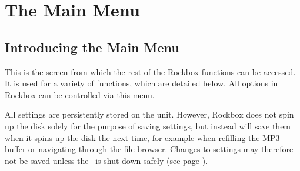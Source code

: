 \chapter{The Main Menu}

\section{Introducing the Main Menu}
This is the screen from which the rest of the Rockbox functions can be 
accessed. It is used for a variety of functions, which are detailed below. 
All options in Rockbox can be controlled via this menu.

All settings are persistently stored on the unit. However, Rockbox does 
not spin up the disk solely for the purpose of saving settings, but instead 
will save them when it spins up the disk the next time, for example when 
refilling the MP3 buffer or navigating through the file browser. Changes to 
settings may therefore not be saved unless the \dap\ is shut down safely 
(see page \pageref{ref:Safeshutdown}).

